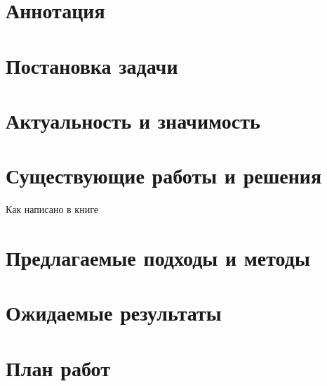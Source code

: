 

\section*{Аннотация}



\section{Постановка задачи}

\section{Актуальность и значимость}

\section{Существующие работы и решения}

Как написано в книге


\section{Предлагаемые подходы и методы} 

\section{Ожидаемые результаты}

\section{План работ}